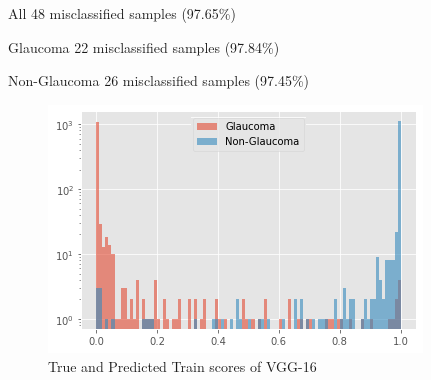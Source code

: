 \begin{center}
All   48 misclassified samples (97.65\%)

Glaucoma  22 misclassified samples (97.84\%)

Non-Glaucoma  26 misclassified samples (97.45\%)
\end{center}
\vspace{5mm}
\begin{figure}[hbt!]
\centering
\includegraphics[scale=0.75]{images/fig-38.png}
\caption{True and Predicted Train scores of VGG-16}
\label{fig:x True and Predicted Train scores of VGG-16}
\end{figure}

